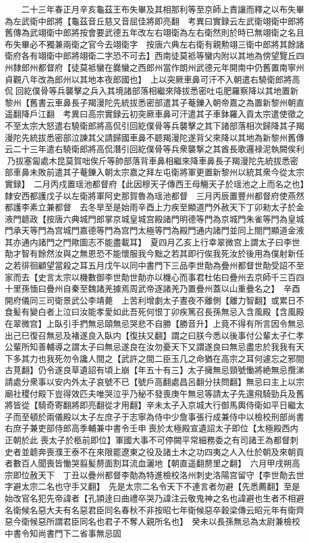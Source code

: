 　　二十三年春正月辛亥龜茲王布失畢及其相那利等至京師上責讓而釋之以布失畢為左武衛中郎將【龜茲音丘慈又音屈佳將即亮翻　考異曰實録云左武衛翊衛中郎將舊傳為武翊衛中郎將按會要武德五年改左右翊衛為左右衛然則於時已無翊衛之名且布失畢必不獨兼兩衛之官今去翊衛字　按唐六典左右衛有親勲翊三衛中郎將其餘諸衛府各有翊衛中郎將翊衛二字恐不可去】西南徒莫袛等蠻内附以其地為傍望覽丘四州隸郎州都督府【徒莫袛蠻在爨蠻之西郎州當作朗州武德元年開南中仍舊置南寧州貞觀八年改為郎州以其地本夜郎國也】　上以突厥車鼻可汗不入朝遣右驍衛郎將高侃回紇僕骨等兵襲擊之兵入其境諸部落相繼來降拔悉密吐屯肥羅察降以其地置新黎州【舊書云車鼻長子羯漫陀先統拔悉密部遣其子菴鑠入朝帝嘉之為置新黎州朝直遥翻降戶江翻　考異曰高宗實録云初突厥車鼻可汗遣其子車鉢羅入貢太宗遣使徵之不至太宗大怒遣右驍衛郎將高侃引回紇僕骨等兵襲擊之其下諸部落相次歸降其子羯漫陀先統拔悉密部泣諫其父請歸國車鼻不聼羯漫陀遂背父來降以其地為新黎州舊傳云二十三年遣右驍衛郎將高侃潛引回紇僕骨等兵衆襲撃之其酋長歌邏禄泥執闕俟利乃拔塞匐處木昆莫賀咄俟斤等帥部落背車鼻相繼來降車鼻長子羯漫陀先統拔悉密部車鼻未敗前遣其子菴鑠入朝太宗嘉之拜左屯衛將軍更置新黎州以統其衆今從太宗實録】　二月丙戍置瑶池都督府【此因穆天子傳西王母觴天子於瑶池之上而名之也】隸安西都護戊子以左衛將軍阿史那賀魯為瑶池都督　三月丙辰置豐州都督府使燕然都護李素立兼都督　去冬旱至是始雨辛酉上力疾至顯道門外赦天下丁卯勑太子於金液門聼政【按唐六典城門郎掌京城皇城宫殿諸門明德等門為京城門朱雀等門為皇城門承天等門為宫城門嘉德等門為宫門太極等門為殿門通内諸門並同上閤門顯道金液其亦通内諸門之門歟圖志不能盡載耳】　夏四月乙亥上行幸翠微宫上謂太子曰李世勣才智有餘然汝與之無恩恐不能懷服我今黜之若其即行俟我死汝於後用為僕射新任之若徘徊顧望當殺之耳五月戊午以同中書門下三品李世勣為疊州都督世勣受詔不至家而去【史言太宗以機數御李世勣世勣亦以機心而事君杜佑曰疊州去京師千三百四十里孫愐曰疊州自秦至魏諸羌據焉周武帝逐諸羌乃置疊州蓋以山重疊名之】　辛酉開府儀同三司衛景武公李靖薨　上苦利增劇太子晝夜不離側【離力智翻】或累日不食髪有變白者上泣曰汝能孝愛如此吾死何恨丁卯疾篤召長孫無忌入含風殿【含風殿在翠微宫】上臥引手捫無忌頤無忌哭悲不自勝【勝音升】上竟不得有所言因令無忌出己巳復召無忌及褚遂良入臥内【復扶又翻】謂之曰朕今悉以後事付公輩太子仁孝公輩所知善輔導之謂太子曰無忌遂良在汝勿憂天下又謂遂良曰無忌盡忠於我我有天下多其力也我死勿令讒人間之【武許之間二臣玉几之命猶在高宗之耳何遽忘之邪間古莧翻】仍令遂良草遺詔有頃上崩【年五十有三】太子擁無忌頸號慟將絶無忌攬涕請處分衆事以安内外太子哀號不已【號戶高翻處昌呂翻分扶問翻】無忌曰主上以宗廟社稷付殿下豈得效匹夫唯哭泣乎乃秘不發喪庚午無忌等請太子先還飛騎勁兵及舊將皆從【騎奇寄翻將即亮翻從才用翻】辛未太子入京城大行御馬輿侍衛如平日繼太子而至頓於兩儀殿以太子左庶子于志寧為侍中少詹事張行成兼侍中以檢校刑部尚書右庶子兼吏部侍郎高季輔兼中書令壬申喪於太極殿宣遺詔太子即位【太極殿西内正朝於此喪太子於柩前即位】軍國大事不可停闕平常細務委之有司諸王為都督刺史者並聼奔喪濮王泰不在來限罷遼東之役及諸土木之功四夷之人入仕於朝及來朝貢者數百人聞喪皆慟哭翦髪剺面割耳流血灑地【朝直遥翻剺里之翻】　六月甲戌朔高宗即位赦天下　丁丑以疊州都督李勣為特進檢校洛州刺史洛陽宫留守【李世勣去世字避太宗二名也守手又翻】　先是太宗二名令天下不連言者勿避【先悉薦翻】至是始改官名犯先帝諱者【孔頴逹曰曲禮卒哭乃諱注云敬鬼神之名也諱避也生者不相避名衛候名惡大夫有名惡君臣同名春秋不非按昭七年衛候惡卒穀梁傳云昭元年有衛齊惡今衛候惡所謂君臣同名也君子不奪人親所名也】　癸未以長孫無忌為太尉兼檢校中書令知尚書門下二省事無忌固